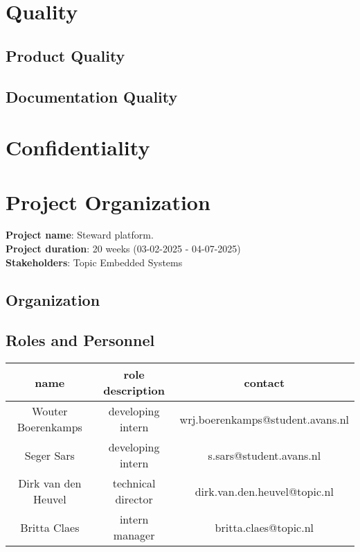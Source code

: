 \documentclass{article}
\begin{document}
\newpage
\section{Quality}
\subsection{Product Quality}
\subsection{Documentation Quality}


\newpage
\section{Confidentiality}


\newpage
\section{Project Organization}
\textbf{Project name}: Steward platform.\\
\textbf{Project duration}: 20 weeks (03-02-2025 - 04-07-2025)\\
\textbf{Stakeholders}: Topic Embedded Systems

\subsection{Organization}
\subsection{Roles and Personnel}
\begin{center}\label{involved-party-table} 
    \begin{tabular}{|c|c|c|} 
        \hline
        name & role description & contact \\ 
        \hline 
        Wouter Boerenkamps & developing intern & wrj.boerenkamps@student.avans.nl \\ 
        \hline 
        Seger Sars & developing intern & s.sars@student.avans.nl \\  
        \hline 
        Dirk van den Heuvel &
        technical director & dirk.van.den.heuvel@topic.nl \\ 
        \hline 
        Britta Claes & intern manager & britta.claes@topic.nl \\ 
        \hline 
    \end{tabular}
\end{center}
\end{document}
